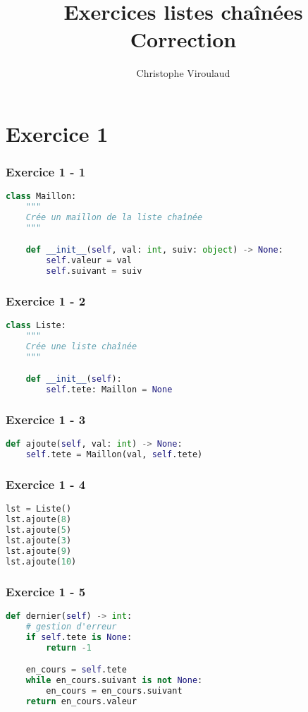 \documentclass[svgnames,11pt]{beamer}
\author[]{Christophe Viroulaud}
\title{Exercices listes chaînées\\Correction}
\date{\framebox{\textbf{Archi 04}}}
\institute{Terminale - NSI}
\begin{document}
\begin{frame}
\titlepage
\end{frame}
\section{Exercice 1}
\begin{frame}[fragile]
    \frametitle{Exercice 1 - 1}

\begin{lstlisting}[language=Python , basicstyle=\ttfamily\small, xleftmargin=0em, xrightmargin=-1em]
class Maillon:
    """
    Crée un maillon de la liste chaînée
    """

    def __init__(self, val: int, suiv: object) -> None:
        self.valeur = val
        self.suivant = suiv
\end{lstlisting}

\end{frame}
\begin{frame}[fragile]
    \frametitle{Exercice 1 - 2}

\begin{lstlisting}[language=Python , basicstyle=\ttfamily\small, xleftmargin=2em, xrightmargin=2em]
class Liste:
    """
    Crée une liste chaînée
    """

    def __init__(self):
        self.tete: Maillon = None
\end{lstlisting}

\end{frame}
\begin{frame}[fragile]
    \frametitle{Exercice 1 - 3}

\begin{lstlisting}[language=Python , basicstyle=\ttfamily\small, xleftmargin=2em, xrightmargin=2em]
def ajoute(self, val: int) -> None:
    self.tete = Maillon(val, self.tete)
\end{lstlisting}

\end{frame}
\begin{frame}[fragile]
    \frametitle{Exercice 1 - 4}

\begin{lstlisting}[language=Python , basicstyle=\ttfamily\small, xleftmargin=2em, xrightmargin=2em]
lst = Liste()
lst.ajoute(8)
lst.ajoute(5)
lst.ajoute(3)
lst.ajoute(9)
lst.ajoute(10)
\end{lstlisting}

\end{frame}
\begin{frame}[fragile]
    \frametitle{Exercice 1 - 5}

\begin{lstlisting}[language=Python , basicstyle=\ttfamily\small, xleftmargin=2em, xrightmargin=2em]
def dernier(self) -> int:
    # gestion d'erreur
    if self.tete is None:
        return -1

    en_cours = self.tete
    while en_cours.suivant is not None:
        en_cours = en_cours.suivant
    return en_cours.valeur
\end{lstlisting}

\end{frame}
\end{document}
